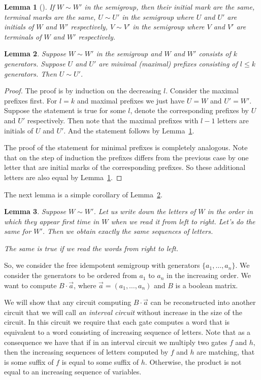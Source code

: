 \documentclass[11pt,letterpaper]{article}
\newtheorem{lemma}{Lemma}
\begin{document}
\begin{lemma}[\cite{GreenR52}] \label{lem:GR}
If $W\sim W'$ in the semigroup, then their initial mark are the same, terminal marks are the same, $U \sim U'$ in the semigroup where $U$ and $U'$ are initials of $W$ and $W'$ respectively, $V\sim V'$ in the semigroup where $V$ and $V'$ are terminals of $W$ and $W'$ respectively.
\end{lemma}

\begin{lemma} \label{lem:prefix_equivalence}
Suppose $W\sim W'$ in the semigroup and $W$ and $W'$ consists of $k$ generators. Suppose $U$ and $U'$ are minimal (maximal) prefixes consisting of $l\leq k$ generators. Then $U\sim U'$.
\end{lemma}

\begin{proof}
The proof is by induction on the decreasing $l$. Consider the maximal prefixes first. For $l=k$ and maximal prefixes we just have $U= W$ and $U'=W'$. Suppose the statement is true for some $l$, denote the corresponding prefixes by $U$ and $U'$ respectively. Then note that the maximal prefixes with $l-1$ letters are initials of $U$ and $U'$. And the statement follows by Lemma~\ref{lem:GR}.

The proof of the statement for minimal prefixes is completely analogous. Note that on the step of induction the prefixes differs from the previous case by one letter that are  initial marks of the corresponding prefixes. So these additional letters are also equal by Lemma~\ref{lem:GR}.
\end{proof}

The next lemma is a simple corollary of Lemma~\ref{lem:prefix_equivalence}.
\begin{lemma} \label{lem:variables_order}
Suppose $W \sim W'$. Let us write down the letters of $W$ in the order in which they appear first time in $W$ when we read it from left to right. Let's do the same for $W'$. Then we obtain exactly the same sequences of letters.

The same is true if we read the words from right to left.
\end{lemma}

So, we consider the free idempotent semigroup with generators $\{a_1,\ldots, a_n\}$.
We consider the generators to be ordered from $a_1$ to $a_n$ in the increasing order. We want to compute $B \cdot \vec{a}$, where $\vec{a}=(a_1,\ldots, a_n)$ and $B$ is a boolean matrix. 

We will show that any circuit computing $B \cdot \vec{a}$ can be reconstructed into another circuit that we will call \emph{an interval circuit} without increase in the size of the circuit. In this circuit we require that each gate computes a word that is equivalent to a word consisting of increasing sequence of letters. Note that as a consequence we have that if in an interval circuit we multiply two gates $f$ and $h$, then the increasing sequences of letters computed by $f$ and $h$ are matching, that is some suffix of $f$ is equal to some suffix of $h$. Otherwise, the product is not equal to an increasing sequence of variables.
\end{document}
